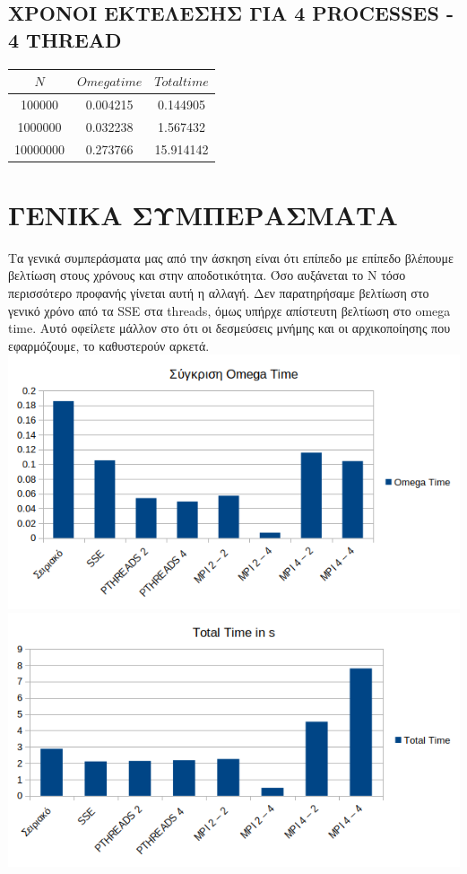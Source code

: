\documentclass{FR16}
\begin{document}
\subsection{ΧΡΟΝΟΙ ΕΚΤΕΛΕΣΗΣ ΓΙΑ 4 PROCESSES - 4 THREAD}
\begin{center}
\begin{tabular}{c c c}
\arrayrulecolor{Azzurro}
\hline
{\bfseries $Ν$} & {\bfseries $Omega time$} & {\bfseries $Total time$}\\
\hline
100000 & 0.004215 & 0.144905 \\
1000000 & 0.032238 & 1.567432 \\
10000000 & 0.273766 & 15.914142 \\
\hline
\end{tabular}
\end{center}

\newpage

\section{ΓΕΝΙΚΑ ΣΥΜΠΕΡΑΣΜΑΤΑ}
Τα γενικά συμπεράσματα μας από την άσκηση είναι ότι επίπεδο με επίπεδο βλέπουμε βελτίωση στους χρόνους και στην αποδοτικότητα. Όσο αυξάνεται το Ν τόσο περισσότερο προφανής γίνεται αυτή η αλλαγή. Δεν παρατηρήσαμε βελτίωση στο γενικό χρόνο από τα SSE στα threads, όμως υπήρχε απίστευτη βελτίωση στο omega time. Αυτό οφείλετε μάλλον στο ότι οι δεσμεύσεις μνήμης και οι αρχικοποίησης που εφαρμόζουμε,  το καθυστερούν αρκετά.\newline
\includegraphics[]{images/first_comp.png}\newline
\includegraphics[]{images/sec_comp.png}\newline
\end{document}
